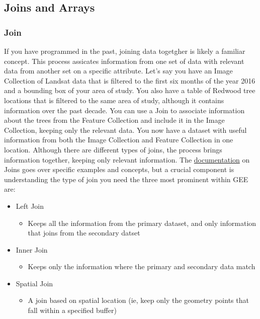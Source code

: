 \documentclass[
]{article}
\providecommand{\tightlist}{%
  \setlength{\itemsep}{0pt}\setlength{\parskip}{0pt}}
\begin{document}
\hypertarget{joins-and-arrays}{%
\subsection{Joins and Arrays}\label{joins-and-arrays}}

\hypertarget{join}{%
\subsubsection{Join}\label{join}}

If you have programmed in the past, joining data togetgher is likely a familiar concept. This process assicates information from one set of data with relevant data from another set on a specific attribute. Let's say you have an Image Collection of Landsat data that is filtered to the first six months of the year 2016 and a bounding box of your area of study. You also have a table of Redwood tree locations that is filtered to the same area of study, although it contains information over the past decade. You can use a Join to associate information about the trees from the Feature Collection and include it in the Image Collection, keeping only the relevant data. You now have a dataset with useful information from both the Image Collection and Feature Collection in one location. Although there are different types of joins, the process brings information together, keeping only relevant information. The \href{https://developers.google.com/earth-engine/guides/joins_save_all}{documentation} on Joins goes over specific examples and concepts, but a crucial component is understanding the type of join you need the three most prominent within GEE are:

\begin{itemize}
\tightlist
\item
  Left Join

  \begin{itemize}
  \tightlist
  \item
    Keeps all the information from the primary dataset, and only information that joins from the secondary datset
  \end{itemize}
\item
  Inner Join

  \begin{itemize}
  \tightlist
  \item
    Keeps only the information where the primary and secondary data match
  \end{itemize}
\item
  Spatial Join

  \begin{itemize}
  \tightlist
  \item
    A join based on spatial location (ie, keep only the geometry points that fall within a specified buffer)
  \end{itemize}
\end{itemize}
\end{document}
